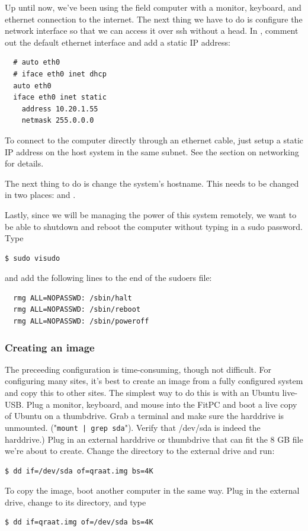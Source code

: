 \documentclass[letter]{article}
\begin{document}
Up until now, we've been using the field computer with a monitor, keyboard, and ethernet connection
to the internet. The next thing we have to do is configure the network interface so that we can 
access it over ssh without a head. In , comment out the default 
ethernet interface and add a static IP address: 
\begin{verbatim}
  # auto eth0
  # iface eth0 inet dhcp
  auto eth0
  iface eth0 inet static
    address 10.20.1.55
    netmask 255.0.0.0
\end{verbatim}
To connect to the computer directly through an ethernet cable, just setup a static IP address on 
the host system in the same subnet. See the section on networking for details. 

The next thing to do is change the system's hostname. This needs to be changed in two places:
 and . 

Lastly, since we will be managing the power of this system remotely, we want to be able to 
shutdown and reboot the computer without typing in a sudo password. Type 
\begin{verbatim}
$ sudo visudo
\end{verbatim}
and add the following lines to the end of the sudoers file: 
\begin{verbatim}
  rmg ALL=NOPASSWD: /sbin/halt
  rmg ALL=NOPASSWD: /sbin/reboot
  rmg ALL=NOPASSWD: /sbin/poweroff
\end{verbatim}

\subsubsection{Creating an image}
The preceeding configuration is time-consuming, though not difficult. For configuring many sites, 
it's best to create an image from a fully configured system and copy this to other sites. The 
simplest way to do this is with an Ubuntu live-USB. Plug a monitor, keyboard, and mouse into the 
FitPC and boot a live copy of Ubuntu on a thumbdrive. Grab a terminal and make sure the harddrive
is unmounted. ("\texttt{mount | grep sda}"). Verify that /dev/sda is indeed the 
harddrive.) Plug in an external harddrive or thumbdrive that can 
fit the 8 GB file we're about to create. Change the directory to the external drive and run: 
\begin{verbatim}
$ dd if=/dev/sda of=qraat.img bs=4K 
\end{verbatim}
To copy the image, boot another computer in the same way. Plug in the external drive, change to 
its directory, and type
\begin{verbatim}
$ dd if=qraat.img of=/dev/sda bs=4K
\end{verbatim}
\end{document}
